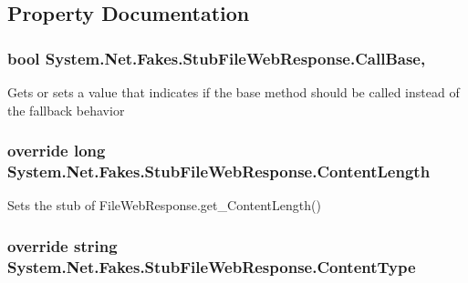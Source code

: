 \subsection{Property Documentation}
\hypertarget{class_system_1_1_net_1_1_fakes_1_1_stub_file_web_response_a059240b4b6905a0a7a4a6e760f7dd10e}{
\subsubsection[{Call\-Base}]{\setlength{\rightskip}{0pt plus 5cm}bool System.\-Net.\-Fakes.\-Stub\-File\-Web\-Response.\-Call\-Base\hspace{0.3cm}{\ttfamily [get]}, {\ttfamily [set]}}}\label{class_system_1_1_net_1_1_fakes_1_1_stub_file_web_response_a059240b4b6905a0a7a4a6e760f7dd10e}


Gets or sets a value that indicates if the base method should be called instead of the fallback behavior

\hypertarget{class_system_1_1_net_1_1_fakes_1_1_stub_file_web_response_a8dedadf925d0041968ae0dac2e3bed3d}{
\subsubsection[{Content\-Length}]{\setlength{\rightskip}{0pt plus 5cm}override long System.\-Net.\-Fakes.\-Stub\-File\-Web\-Response.\-Content\-Length\hspace{0.3cm}{\ttfamily [get]}}}\label{class_system_1_1_net_1_1_fakes_1_1_stub_file_web_response_a8dedadf925d0041968ae0dac2e3bed3d}


Sets the stub of File\-Web\-Response.\-get\-\_\-\-Content\-Length()

\hypertarget{class_system_1_1_net_1_1_fakes_1_1_stub_file_web_response_a6dad3d8f36c757b83f00752ef237ae00}{
\subsubsection[{Content\-Type}]{\setlength{\rightskip}{0pt plus 5cm}override string System.\-Net.\-Fakes.\-Stub\-File\-Web\-Response.\-Content\-Type\hspace{0.3cm}{\ttfamily [get]}}}\label{class_system_1_1_net_1_1_fakes_1_1_stub_file_web_response_a6dad3d8f36c757b83f00752ef237ae00}


